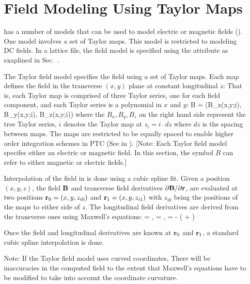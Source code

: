 \section{Field Modeling Using Taylor Maps}
\label{s:taylor.field.phys}

\bmad has a number of  models that can be used to model electric or magnetic fields
(). One model involves a set of Taylor maps. This model is restricted to
modeling DC fields. In a lattice file, the  field model is specified using the
 attribute as exaplined in Sec.~.

The Taylor field model specifies the field using a set of Taylor maps. Each map defines
the field in the transverse $(x, y)$ plane at constant longitudinal $z$: That is, each
Taylor map is comprised of three Taylor series, one for each field component, and each
Taylor series is a polynomial in $x$ and $y$:
\Begineq
  \Bf B = (B_x(x,y;i), B_y(x,y;i), B_z(x,y;i))
\Endeq
where the $B_x, B_y, B_z$ on the right hand side represent the tree Taylor series, $i$
denotes the Taylor map at $z_i = i \cdot dz$ where $dz$ is the spacing between maps. The
maps are restricted to be equally spaced to enable higher order integration schemes in PTC
(See  in ).  [Note: Each Taylor field model
specifes either an electric or magnetic field. In this section, the symbol $B$ can refer
to either magnetic or electric fields.]

Interpolation of the field in \bmad is done using a cubic spline fit. Given a position
$(x, y, z)$, the field ${\bf B}$ and transverse field derivatives $\partial {\bf B} / \partial
{\bf r}$, are evaluated at two positions ${\bf r}_0 = (x, y, z_{i0})$ and ${\bf r}_1 = (x, y,
z_{i1})$ with $z_{i0}$ being the positions of the maps to either side of $z$.
The longitudinal field derivatives are derived from the transverse ones using Maxwell's equations:
\Begineq
   = , \qquad
   = , \qquad
   = 
    - \left(  +  \right)
\Endeq

Once the field and longitudinal derivatives are known at ${\bf r}_0$ and ${\bf r}_1$, a
standard cubic spline interpolation is done.

Note: If the Taylor field model uses curved coordinates, There will be inaccuracies in the
computed field to the extent that Maxwell's equations have to be modified to take into
account the coordinate curvature.

